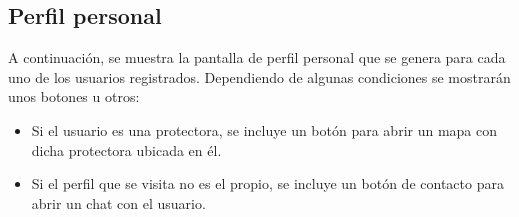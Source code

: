 \documentclass[a4paper, 12pt]{article}
\begin{document}
\newpage
\subsection*{Perfil personal}

A continuación, se muestra la pantalla de perfil personal que se genera para cada uno de los usuarios registrados. Dependiendo de algunas condiciones se mostrarán unos botones u otros:

\begin{itemize}[noitemsep]
	\item Si el usuario es una protectora, se incluye un botón para abrir un mapa con dicha protectora ubicada en él.
	\item Si el perfil que se visita no es el propio, se incluye un botón de contacto para abrir un chat con el usuario.
\end{itemize}
\end{document}
